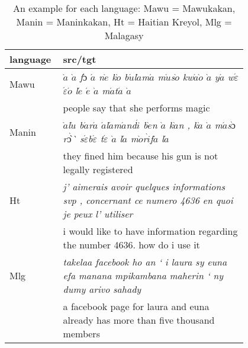 
\begin{table*}
	\setlength{\tabcolsep}{4.5pt}
	\small
	\small
	\begin{tabular}{p{0.1\linewidth}p{0.7\linewidth}}
	\toprule
	language & src/tgt \\
	\toprule
	Mawu & \emph{$\grave{a}$ $\grave{a}$ f$\acute{ɔ}$ $\acute{a}$ n$\grave{e}$ k$\grave{o}$ b$\acute{u}$l$\grave{a}$m$\acute{a}$ m$\grave{u}$s$\grave{o}$ kw$\acute{a}$$\grave{o}$ $\grave{a}$ y$\acute{a}$ w$\acute{\varepsilon}$$\acute{\varepsilon}$$\acute{o}$ l$\acute{e}$ $\acute{e}$ $\grave{a}$ m$\acute{a}$t$\acute{a}$
	$\grave{a}$} \\
	 & people say that she performs magic\\
	\midrule
	Manin & \emph{$\grave{a}$l$\grave{u}$  b$\acute{a}$r$\acute{a}$ $\acute{a}$l$\acute{a}$m$\acute{a}$nd$\acute{i}$ b$\grave{e}$n $\grave{a}$ k$\grave{a}$n , k$\grave{a}$ $\grave{a}$ m$\acute{a}$s$\grave{ɔ}$r$\grave{ɔ̀}$̀  s$\acute{\varepsilon}$b$\acute{\varepsilon}$ t$\acute{\varepsilon}$ $\grave{a}$ l$\acute{a}$ 
	m$\grave{o}$r$\grave{i}$f$\grave{a}$ l$\acute{a}$} \\

	  & they fined him because his gun is not legally registered\\
	\midrule
	Ht & \emph{j' aimerais avoir quelques informations svp , concernant ce numero 4636 en quoi je peux l' utiliser} \\

	&	 i would like to have information regarding the number 4636. how do i use it\\
	\midrule
	
	Mlg & \emph{takelaa facebook ho an ` i laura sy euna efa manana mpikambana maherin  ` ny dumy arivo sahady} \\
	 & a facebook page for laura and euna already has more than five thousand members\\
	\bottomrule
	\end{tabular}
	\caption{An example for each language: Mawu = Mawukakan, Manin = Maninkakan, Ht = Haitian Kreyol, Mlg = Malagasy}
	\label{table:example_each}
\end{table*}
		
